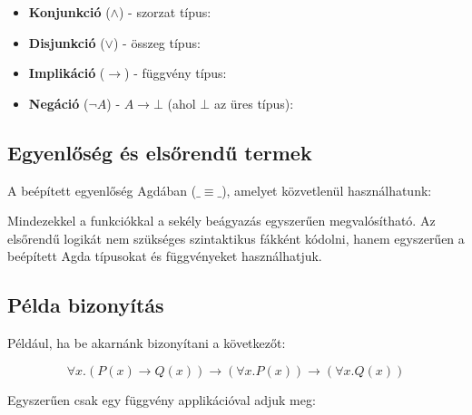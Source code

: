\begin{itemize}
    \item \textbf{Konjunkció} ($\land$) - szorzat típus:
\miscConjunction
    \item \textbf{Disjunkció} ($\lor$) - összeg típus:
\miscDisjunction
    \item \textbf{Implikáció} ($\rightarrow$) - függvény típus:
\miscImplication
    \item \textbf{Negáció} ($\neg A$) - $ A \rightarrow \bot $ (ahol $\bot$ az üres típus):
\miscNegation
\end{itemize}

\subsection{Egyenlőség és elsőrendű termek}

A beépített egyenlőség Agdában ($ \_≡\_ $), amelyet közvetlenül használhatunk:

\miscEquality

Mindezekkel a funkciókkal a sekély beágyazás egyszerűen megvalósítható. Az elsőrendű logikát nem szükséges szintaktikus fákként kódolni, hanem egyszerűen a beépített Agda típusokat és függvényeket használhatjuk.

\subsection{Példa bizonyítás}

Például, ha be akarnánk bizonyítani a következőt:

\[ \forall x. (P(x) \rightarrow Q(x)) \rightarrow (\forall x. P(x)) \rightarrow (\forall x. Q(x)) \]

Egyszerűen csak egy függvény applikációval adjuk meg:

\miscExLemma


